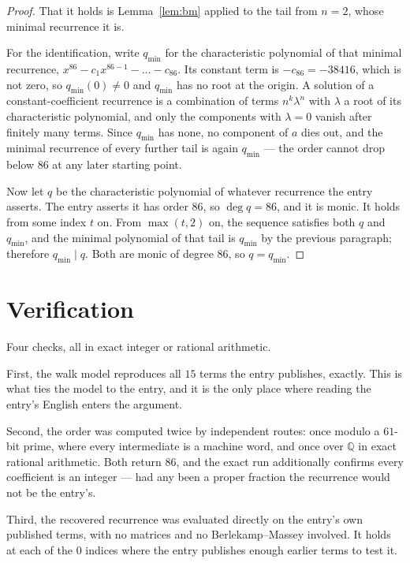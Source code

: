 \documentclass[11pt,a4paper]{article}
\theoremstyle{plain}
\theoremstyle{definition}
\begin{document}
\begin{proof}
That it holds is Lemma~\ref{lem:bm} applied to the tail from $n=2$, whose minimal
recurrence it is.

For the identification, write $q_{\min}$ for the characteristic polynomial of that minimal
recurrence, $x^{86}-c_1x^{86-1}-\dots-c_{86}$. Its constant term is
$-c_{86}=-38416$, which is not zero, so $q_{\min}(0)\neq0$ and $q_{\min}$ has no
root at the origin. A solution of a constant-coefficient recurrence is a combination of terms
$n^{k}\lambda^{n}$ with $\lambda$ a root of its characteristic polynomial, and only the
components with $\lambda=0$ vanish after finitely many terms. Since $q_{\min}$ has none, no
component of $a$ dies out, and the minimal recurrence of every further tail is again
$q_{\min}$ --- the order cannot drop below $86$ at any later starting point.

Now let $q$ be the characteristic polynomial of whatever recurrence the entry asserts. The
entry asserts it has order $86$, so $\deg q=86$, and it is monic. It holds from some
index $t$ on. From $\max(t,2)$ on, the sequence satisfies both $q$ and $q_{\min}$, and
the minimal polynomial of that tail is $q_{\min}$ by the previous paragraph; therefore
$q_{\min}\mid q$. Both are monic of degree $86$, so $q=q_{\min}$.
\end{proof}

\section{Verification}

Four checks, all in exact integer or rational arithmetic.

First, the walk model reproduces all $15$ terms the entry publishes, exactly. This is
what ties the model to the entry, and it is the only place where reading the entry's English
enters the argument.

Second, the order was computed twice by independent routes: once modulo a $61$-bit prime, where
every intermediate is a machine word, and once over $\mathbb{Q}$ in exact rational arithmetic.
Both return $86$, and the exact run additionally confirms every coefficient is an integer
--- had any been a proper fraction the recurrence would not be the entry's.

Third, the recovered recurrence was evaluated directly on the entry's own published terms, with
no matrices and no Berlekamp--Massey involved. It holds at each of the $0$ indices where
the entry publishes enough earlier terms to test it.
\end{document}
